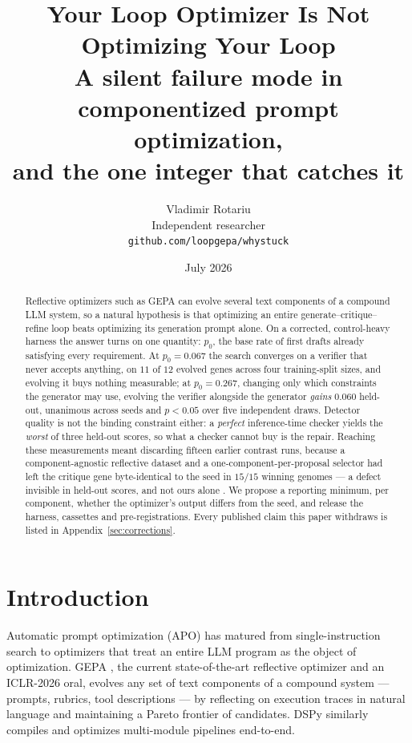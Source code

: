 \documentclass[11pt]{article}
\title{Your Loop Optimizer Is Not Optimizing Your Loop\\
\large A silent failure mode in componentized prompt optimization,\\
and the one integer that catches it}
\author{Vladimir Rotariu \\ Independent researcher \\
  \texttt{github.com/loopgepa/whystuck}}
\date{July 2026}
\begin{document}
\maketitle

\begin{abstract}
Reflective optimizers such as GEPA \citep{agrawal2025gepa} can evolve several text components of a
compound LLM system, so a natural hypothesis is that optimizing an entire
generate--critique--refine loop beats optimizing its generation prompt alone. On a corrected,
control-heavy harness the answer turns on one quantity: $p_0$, the base rate of first drafts
already satisfying every requirement. At $p_0 = 0.067$ the search converges on a verifier that
never accepts anything, on $11$ of $12$ evolved genes across four training-split sizes, and
evolving it buys nothing measurable; at $p_0 = 0.267$, changing only which constraints the
generator may use, evolving the verifier alongside the generator \emph{gains} $0.060$ held-out,
unanimous across seeds and $p<0.05$ over five independent draws. Detector quality is not the
binding constraint either: a \emph{perfect} inference-time checker yields the \emph{worst} of
three held-out scores, so what a checker cannot buy is the repair. Reaching these measurements
meant discarding fifteen earlier contrast runs, because a component-agnostic reflective dataset
and a one-component-per-proposal selector had left the critique gene byte-identical to the seed in
$15/15$ winning genomes --- a defect invisible in held-out scores, and not ours alone
\citep{pappu2026multiagent}. We propose a reporting minimum, per component, whether the
optimizer's output differs from the seed, and release the harness, cassettes and
pre-registrations. Every published claim this paper withdraws is listed in
Appendix~\ref{sec:corrections}.
\end{abstract}
\section{Introduction}
\label{sec:intro}

Automatic prompt optimization (APO) has matured from single-instruction search
\citep{madaan2023selfrefine} to optimizers that treat an entire LLM program as
the object of optimization. GEPA \citep{agrawal2025gepa}, the current
state-of-the-art reflective optimizer and an ICLR-2026 oral, evolves any set of
text components of a compound system --- prompts, rubrics, tool descriptions ---
by reflecting on execution traces in natural language and maintaining a Pareto
frontier of candidates. DSPy \citep{khattab2023dspy} similarly compiles and
optimizes multi-module pipelines end-to-end.
\end{document}
